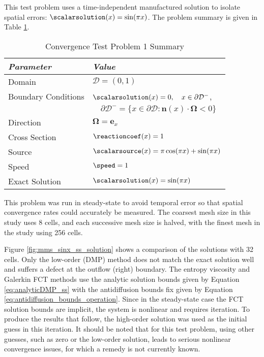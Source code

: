 This test problem uses a time-independent manufactured solution to isolate
spatial errors: $\scalarsolution(x)=\sin(\pi x)$. The problem summary is
given in Table \ref{tab:mms_sinx_ss}.

\begin{table}[htb]\caption{Convergence Test Problem 1 Summary}
\label{tab:mms_sinx_ss}
\centering
\begin{tabular}{l l}\toprule
\emph{Parameter} & \emph{Value}\\\midrule
Domain & $\mathcal{D} = (0,1)$\\
Boundary Conditions & $\scalarsolution(x)=0,\quad x\in\partial\mathcal{D}^-$,\\
   & $\quad\partial\mathcal{D}^-=\{x\in\partial\mathcal{D}:\mathbf{n}(x)
       \cdot\mathbf{\Omega}<0\}$\\
Direction & $\mathbf{\Omega} = \mathbf{e}_x$\\
Cross Section & $\reactioncoef(x)=1$\\
Source & $\scalarsource(x)=\pi\cos(\pi x) + \sin(\pi x)$\\
Speed & $\speed=1$\\
Exact Solution & $\scalarsolution(x)=\sin(\pi x)$\\
\bottomrule\end{tabular}
\end{table}

This problem was run in steady-state to avoid temporal error so that spatial
convergence rates could accurately be measured.
The coarsest mesh size in this study uses 8 cells, and each successive mesh
size is halved, with the finest mesh in the study using 256 cells.

Figure \ref{fig:mms_sinx_ss_solution} shows a comparison of the solutions with
32 cells. Only the low-order (DMP) method does not match the exact solution
well and suffers a defect at the outflow (right) boundary.
The entropy viscosity and Galerkin FCT methods use the analytic solution bounds
given by Equation \eqref{eq:analyticDMP_ss} with the antidiffusion bounds fix given by
Equation \eqref{eq:antidiffusion_bounds_operation}. Since in the steady-state
case the FCT solution bounds are implicit, the system is nonlinear and requires
iteration. To produce the results that follow, the high-order solution was
used as the initial guess in this iteration. It should be noted that for this
test problem, using other guesses, such as zero or the low-order solution,
leads to serious nonlinear convergence issues, for which a remedy is not
currently known.

